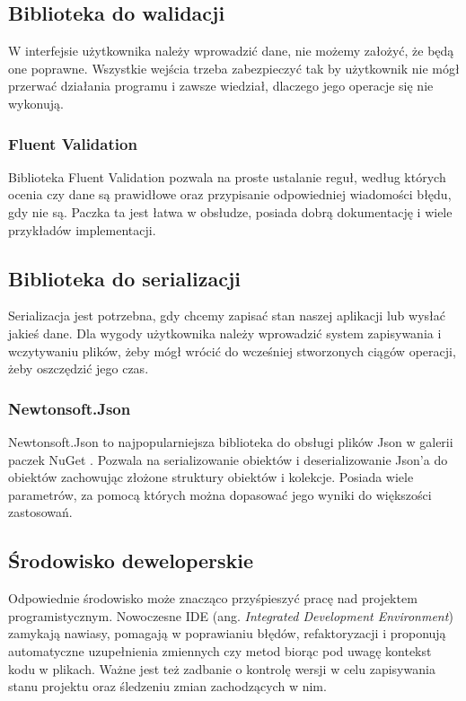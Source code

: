 \subsection{Biblioteka do walidacji}

W interfejsie użytkownika należy wprowadzić dane, nie możemy założyć, że będą one poprawne.
Wszystkie wejścia trzeba zabezpieczyć tak by użytkownik nie mógł przerwać działania programu i zawsze wiedział, dlaczego jego operacje się nie wykonują.

\subsubsection{Fluent Validation}

Biblioteka Fluent Validation \cite{fluentvalidation} pozwala na proste ustalanie reguł, według których ocenia czy dane są prawidłowe oraz przypisanie odpowiedniej wiadomości błędu, gdy nie są. Paczka ta jest łatwa w obsłudze, posiada dobrą dokumentację i wiele przykładów implementacji. 

\subsection{Biblioteka do serializacji}

Serializacja jest potrzebna, gdy chcemy zapisać stan naszej aplikacji lub wysłać jakieś dane. Dla wygody użytkownika należy wprowadzić system zapisywania i wczytywaniu plików, żeby mógł wrócić do wcześniej stworzonych ciągów operacji, żeby oszczędzić jego czas. 

\subsubsection{Newtonsoft.Json}

Newtonsoft.Json \cite{Newtonsoft.Json} to najpopularniejsza biblioteka do obsługi plików Json w galerii paczek NuGet \cite{jsonMostPop}. 
Pozwala na serializowanie obiektów i deserializowanie Json'a do obiektów zachowując złożone struktury obiektów i kolekcje. Posiada wiele parametrów, za pomocą których można dopasować jego wyniki do większości zastosowań. 

\subsection{Środowisko deweloperskie}

Odpowiednie środowisko może znacząco przyśpieszyć pracę nad projektem programistycznym. 
Nowoczesne IDE (ang. \textit{Integrated Development Environment}) zamykają nawiasy, pomagają w poprawianiu błędów, refaktoryzacji i proponują automatyczne uzupełnienia zmiennych czy metod biorąc pod uwagę kontekst kodu w plikach.
Ważne jest też zadbanie o kontrolę wersji w celu zapisywania stanu projektu oraz śledzeniu zmian zachodzących w nim.

